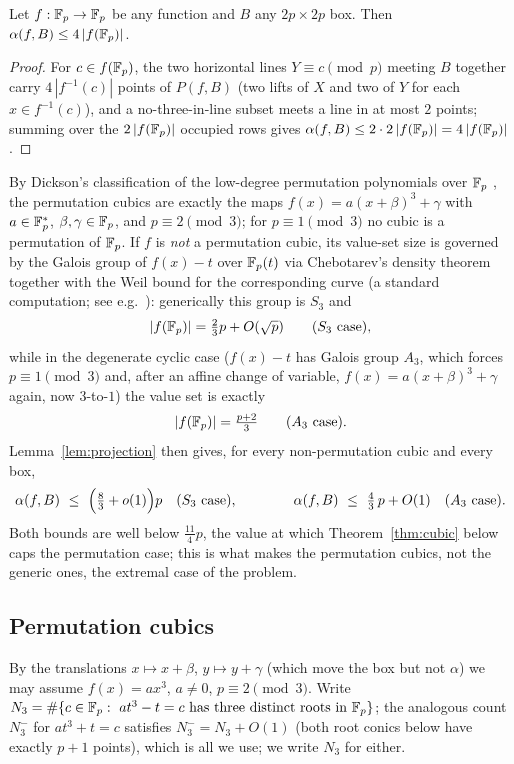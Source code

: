 \begin{lemma}\label{lem:projection}
Let $f:\mathbb{F}_p\to\mathbb{F}_p$ be any function and $B$ any $2p\times2p$ box. Then $\alpha(f,B)\le4\,|f(\mathbb{F}_p)|$.
\end{lemma}
\begin{proof}
For $c\in f(\mathbb{F}_p)$, the two horizontal lines $Y\equiv c\pmod p$ meeting $B$ together carry $4\,|f^{-1}(c)|$ points of
$P(f,B)$ (two lifts of $X$ and two of $Y$ for each $x\in f^{-1}(c)$), and a no-three-in-line subset meets a line in at most $2$
points; summing over the $2\,|f(\mathbb{F}_p)|$ occupied rows gives $\alpha(f,B)\le2\cdot2\,|f(\mathbb{F}_p)|=4\,|f(\mathbb{F}_p)|$.
\end{proof}

By Dickson's classification of the low-degree permutation polynomials over $\mathbb{F}_p$ \cite{Dickson1897,LidlNiederreiter},
the permutation cubics are exactly the maps $f(x)=a(x+\beta)^3+\gamma$ with $a\in\mathbb{F}_p^*$, $\beta,\gamma\in\mathbb{F}_p$, and
$p\equiv2\pmod3$; for $p\equiv1\pmod3$ no cubic is a permutation of $\mathbb{F}_p$. If $f$ is \emph{not} a permutation cubic,
its value-set size is governed by the Galois group of $f(x)-t$ over $\mathbb{F}_p(t)$ via Chebotarev's density theorem
together with the Weil bound for the corresponding curve (a standard computation; see e.g.\ \cite{IK,LidlNiederreiter}):
generically this group is $S_3$ and
\[
|f(\mathbb{F}_p)|=\tfrac23p+O(\sqrt p)\qquad(S_3\ \text{case}),
\]
while in the degenerate cyclic case ($f(x)-t$ has Galois group $A_3$, which forces $p\equiv1\pmod3$ and, after an
affine change of variable, $f(x)=a(x+\beta)^3+\gamma$ again, now $3$-to-$1$) the value set is exactly
\[
|f(\Fp)|=\tfrac{p+2}3\qquad(A_3\ \text{case}).
\]
Lemma~\ref{lem:projection} then gives, for every non-permutation cubic and every box,
\begin{equation}\label{eq:nonperm}
\alpha(f,B)\ \le\ \Bigl(\tfrac83+o(1)\Bigr)p\quad(S_3\ \text{case}),\qquad\qquad
\alpha(f,B)\ \le\ \tfrac43\,p+O(1)\quad(A_3\ \text{case}).
\end{equation}
Both bounds are well below $\tfrac{11}4p$, the value at which Theorem~\ref{thm:cubic} below caps the permutation
case; this is what makes the permutation cubics, not the generic ones, the extremal case of the problem.

\subsection*{Permutation cubics}

By the translations $x\mapsto x+\beta$, $y\mapsto y+\gamma$ (which move the box but not $\alpha$) we may assume
$f(x)=ax^3$, $a\ne0$, $p\equiv2\pmod3$. Write $N_3=\#\{c\in\mathbb{F}_p:\ at^3-t=c\ \text{has three distinct roots in }\mathbb{F}_p\}$;
the analogous count $N_3^-$ for $at^3+t=c$ satisfies $N_3^-=N_3+O(1)$ (both root conics below have exactly $p+1$
points), which is all we use; we write $N_3$ for either.

